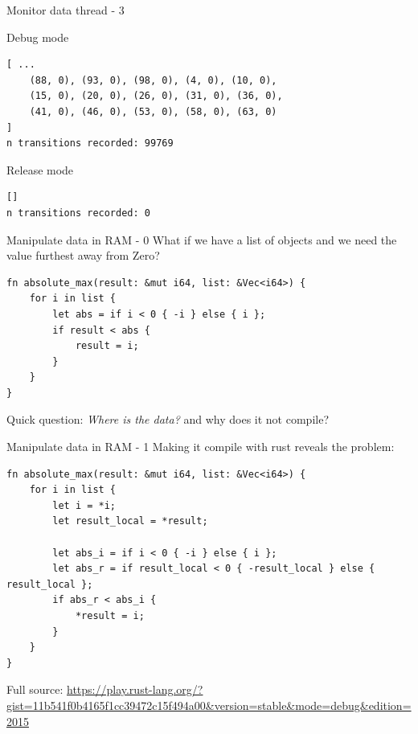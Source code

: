 \documentclass[10pt]{beamer}
\begin{document}
\begin{frame}[fragile]{Monitor data thread - 3}

      \begin{block}{Debug mode}
\begin{verbatim}
[ ... 
    (88, 0), (93, 0), (98, 0), (4, 0), (10, 0), 
    (15, 0), (20, 0), (26, 0), (31, 0), (36, 0), 
    (41, 0), (46, 0), (53, 0), (58, 0), (63, 0) 
]
n transitions recorded: 99769
\end{verbatim}
      \end{block}

    \begin{block}{Release mode}
\begin{verbatim}
[]
n transitions recorded: 0
\end{verbatim}
      \end{block}
\end{frame}

\begin{frame}[fragile]{Manipulate data in RAM - 0}
What if we have a list of objects and we need the value furthest away from Zero?
\begin{verbatim}
fn absolute_max(result: &mut i64, list: &Vec<i64>) {
    for i in list {
        let abs = if i < 0 { -i } else { i };
        if result < abs {
            result = i;
        }
    }
}
\end{verbatim}
Quick question: \emph{Where is the data?} and why does it \alert{not} compile?
\end{frame}

\begin{frame}[fragile]{Manipulate data in RAM - 1}
Making it compile with rust reveals the problem:
\begin{verbatim}
fn absolute_max(result: &mut i64, list: &Vec<i64>) {
    for i in list {
        let i = *i;
        let result_local = *result;
        
        let abs_i = if i < 0 { -i } else { i };
        let abs_r = if result_local < 0 { -result_local } else { result_local };
        if abs_r < abs_i {
            *result = i;
        }
    }
}
\end{verbatim}
Full source: \url{https://play.rust-lang.org/?gist=11b541f0b4165f1cc39472c15f494a00&version=stable&mode=debug&edition=2015}
\end{frame}
\end{document}
